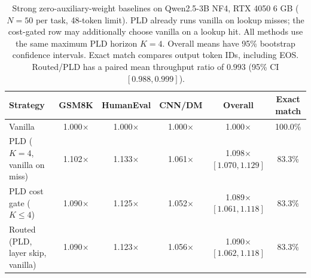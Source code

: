 \begin{table}[t]
\centering
\small
\caption{Strong zero-auxiliary-weight baselines on Qwen2.5-3B NF4, RTX 4050 6 GB ($N{=}50$ per task, 48-token limit). PLD already runs vanilla on lookup misses; the cost-gated row may additionally choose vanilla on a lookup hit. All methods use the same maximum PLD horizon $K{=}4$. Overall means have 95\% bootstrap confidence intervals. Exact match compares output token IDs, including EOS. Routed/PLD has a paired mean throughput ratio of $0.993$ (95\% CI $[0.988,0.999]$).}
\label{tab:routed_benchmarks}
\begin{tabular}{lccccc}
\toprule
\textbf{Strategy} & \textbf{GSM8K} & \textbf{HumanEval} & \textbf{CNN/DM} & \textbf{Overall} & \textbf{Exact match} \\
\midrule
Vanilla & 1.000$\times$ & 1.000$\times$ & 1.000$\times$ & 1.000$\times$ & 100.0\% \\
PLD ($K{=}4$, vanilla on miss) & 1.102$\times$ & 1.133$\times$ & 1.061$\times$ & 1.098$\times$ $[1.070,1.129]$ & 83.3\% \\
PLD cost gate ($K{\le}4$) & 1.090$\times$ & 1.125$\times$ & 1.052$\times$ & 1.089$\times$ $[1.061,1.118]$ & 83.3\% \\
Routed (PLD, layer skip, vanilla) & 1.090$\times$ & 1.123$\times$ & 1.056$\times$ & 1.090$\times$ $[1.062,1.118]$ & 83.3\% \\
\bottomrule
\end{tabular}
\end{table}
